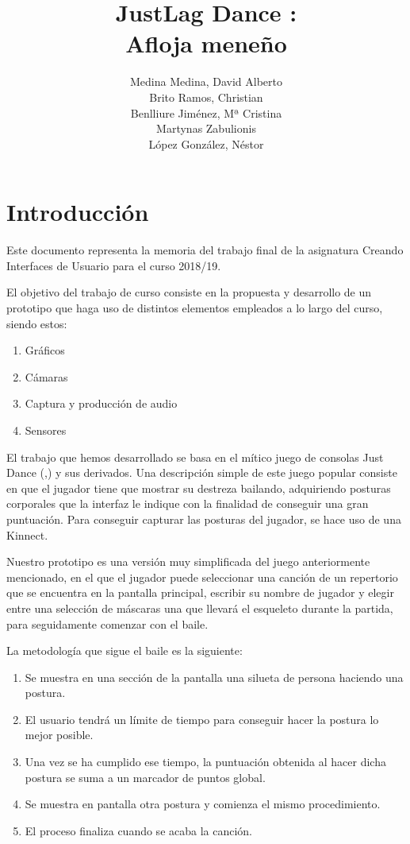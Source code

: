 \documentclass[10pt,a4paper]{report}
\author{Medina Medina, David Alberto
	\\Brito Ramos, Christian
	\\Benlliure Jiménez, Mª Cristina
	\\Martynas Zabulionis
	\\López González, Néstor}
\title{JustLag Dance :\\ Afloja meneño}
\begin{document}
	\maketitle
	\tableofcontents
	
	\chapter{Introducción}
	Este documento representa la memoria del trabajo final de la asignatura Creando Interfaces de Usuario para el curso 2018/19. 

El objetivo del trabajo de curso consiste en la propuesta y desarrollo de un prototipo que haga uso de distintos elementos empleados a lo largo del curso, siendo estos: 

	\begin{enumerate}
	\item Gráficos
	\item Cámaras
	\item Captura y producción de audio
	\item Sensores
	\end{enumerate}
	
	El trabajo que hemos desarrollado se basa en el mítico juego de consolas Just Dance (\cite{github},\cite{teaser-video}) y sus derivados. Una descripción simple de este juego popular consiste en que el jugador tiene que mostrar su destreza bailando, adquiriendo posturas corporales que la interfaz le indique con la finalidad de conseguir una gran puntuación. Para conseguir capturar las posturas del jugador, se hace uso de una Kinnect.

Nuestro prototipo es una versión muy simplificada del juego anteriormente mencionado, en el que el jugador puede seleccionar una canción de un repertorio que se encuentra en la pantalla principal, escribir su nombre de jugador y elegir entre una selección de máscaras una que llevará el esqueleto durante la partida, para seguidamente comenzar con el baile.

La metodología que sigue el baile es la siguiente:

	\begin{enumerate}
	\item Se muestra en una sección de la pantalla una silueta de persona haciendo una postura.
	\item El usuario tendrá un límite de tiempo para conseguir hacer la postura lo mejor posible.
	\item Una vez se ha cumplido ese tiempo, la puntuación obtenida al hacer dicha postura se suma a un marcador de puntos global.
	\item Se muestra en pantalla otra postura y comienza el mismo procedimiento.
	\item El proceso finaliza cuando se acaba la canción.
	\end{enumerate}
	
\end{document}
